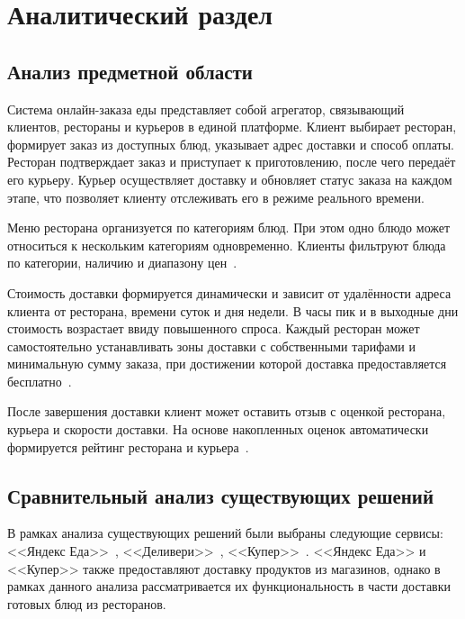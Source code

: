 \section{Аналитический раздел}

\subsection{Анализ предметной области}

Система онлайн-заказа еды представляет собой агрегатор, связывающий клиентов, рестораны и курьеров в единой платформе. Клиент выбирает ресторан, формирует заказ из доступных блюд, указывает адрес доставки
и способ оплаты. Ресторан подтверждает заказ и приступает к приготовлению, после чего передаёт его курьеру. Курьер осуществляет доставку и обновляет статус заказа на каждом этапе, что позволяет клиенту отслеживать его в режиме реального времени.

Меню ресторана организуется по категориям блюд. При этом одно блюдо может относиться к нескольким категориям одновременно. Клиенты фильтруют блюда по категории, наличию и диапазону цен~\cite{salnikova2025}.

Стоимость доставки формируется динамически и зависит от удалённости адреса клиента от ресторана, времени суток и дня недели. В часы пик и в выходные дни стоимость возрастает ввиду повышенного спроса. Каждый ресторан может самостоятельно устанавливать зоны доставки с собственными тарифами и минимальную сумму заказа, при достижении которой доставка предоставляется бесплатно~\cite{martynov2025pricing}.

После завершения доставки клиент может оставить отзыв с оценкой ресторана, курьера и скорости доставки. На основе накопленных оценок автоматически формируется рейтинг ресторана и курьера~\cite{yandex_rating}.

\subsection{Сравнительный анализ существующих решений}
В рамках анализа существующих решений были выбраны следующие сервисы: <<Яндекс Еда>>~\cite{yandex}, <<Деливери>>~\cite{delivery}, <<Купер>>~\cite{kuper}. <<Яндекс Еда>> и <<Купер>> также предоставляют доставку продуктов из магазинов, однако в рамках данного анализа рассматривается их функциональность в части доставки готовых блюд из ресторанов.


